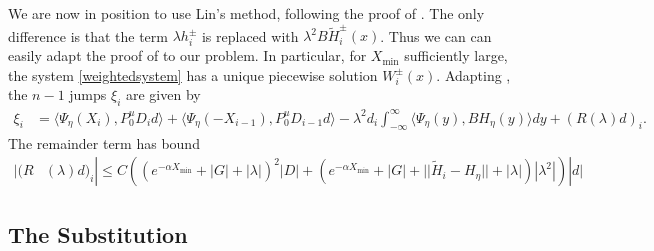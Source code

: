 \documentclass[thesis.tex]{subfiles}
\begin{document}
We are now in position to use Lin's method, following the proof of \cite[Theorem 2]{Sandstede1998}. The only difference is that the term $\lambda h_i^\pm$ is replaced with $\lambda^2 B \tilde{H}_i^\pm(x)$. Thus we can can easily adapt the proof of \cite[Theorem 2]{Sandstede1998} to our problem. In particular, for $X_{\min}$ sufficiently large, the system \eqref{weightedsystem} has a unique piecewise solution $W_i^\pm(x)$. Adapting \cite[Lemma 3.6]{Sandstede1998}, the $n-1$ jumps $\xi_i$ are given by
\begin{align}\label{weightedjumps1}
\xi_i &= \langle \Psi_\eta(X_i), P_0^u D_i d \rangle
+ \langle \Psi_\eta(-X_{i-1}), P_0^u D_{i-1} d \rangle
- \lambda^2 d_i \int_{-\infty}^\infty \langle \Psi_\eta(y), B H_\eta(y) \rangle dy
+ (R(\lambda)d)_i.
\end{align}
The remainder term has bound
\begin{align*}\label{weightedR1}
|(R&(\lambda)d)_i| \leq C \left( (e^{-\alpha X_{\min}} + |G| + |\lambda|)^2 |D| + (e^{-\alpha X_{\min}} + |G| + ||\tilde{H}_i - H_\eta|| + |\lambda| )|\lambda^2| \right)|d|
\end{align*}

\subsection{The Substitution}
\end{document}
